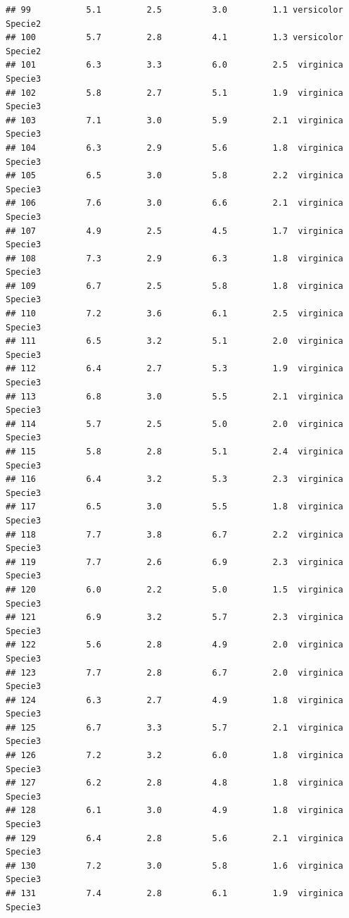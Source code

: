 \documentclass[
]{book}
\begin{document}
\begin{verbatim}
## 99           5.1         2.5          3.0         1.1 versicolor    Specie2
## 100          5.7         2.8          4.1         1.3 versicolor    Specie2
## 101          6.3         3.3          6.0         2.5  virginica    Specie3
## 102          5.8         2.7          5.1         1.9  virginica    Specie3
## 103          7.1         3.0          5.9         2.1  virginica    Specie3
## 104          6.3         2.9          5.6         1.8  virginica    Specie3
## 105          6.5         3.0          5.8         2.2  virginica    Specie3
## 106          7.6         3.0          6.6         2.1  virginica    Specie3
## 107          4.9         2.5          4.5         1.7  virginica    Specie3
## 108          7.3         2.9          6.3         1.8  virginica    Specie3
## 109          6.7         2.5          5.8         1.8  virginica    Specie3
## 110          7.2         3.6          6.1         2.5  virginica    Specie3
## 111          6.5         3.2          5.1         2.0  virginica    Specie3
## 112          6.4         2.7          5.3         1.9  virginica    Specie3
## 113          6.8         3.0          5.5         2.1  virginica    Specie3
## 114          5.7         2.5          5.0         2.0  virginica    Specie3
## 115          5.8         2.8          5.1         2.4  virginica    Specie3
## 116          6.4         3.2          5.3         2.3  virginica    Specie3
## 117          6.5         3.0          5.5         1.8  virginica    Specie3
## 118          7.7         3.8          6.7         2.2  virginica    Specie3
## 119          7.7         2.6          6.9         2.3  virginica    Specie3
## 120          6.0         2.2          5.0         1.5  virginica    Specie3
## 121          6.9         3.2          5.7         2.3  virginica    Specie3
## 122          5.6         2.8          4.9         2.0  virginica    Specie3
## 123          7.7         2.8          6.7         2.0  virginica    Specie3
## 124          6.3         2.7          4.9         1.8  virginica    Specie3
## 125          6.7         3.3          5.7         2.1  virginica    Specie3
## 126          7.2         3.2          6.0         1.8  virginica    Specie3
## 127          6.2         2.8          4.8         1.8  virginica    Specie3
## 128          6.1         3.0          4.9         1.8  virginica    Specie3
## 129          6.4         2.8          5.6         2.1  virginica    Specie3
## 130          7.2         3.0          5.8         1.6  virginica    Specie3
## 131          7.4         2.8          6.1         1.9  virginica    Specie3

\end{verbatim}
\end{document}

